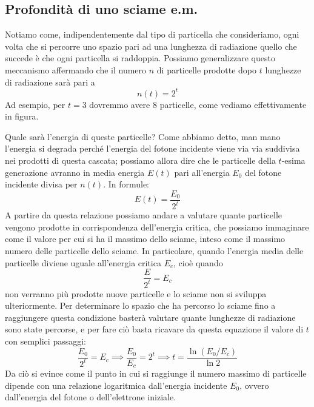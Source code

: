 \subsection{Profondità di uno sciame e.m.}

Notiamo come, indipendentemente dal tipo di particella che consideriamo, ogni volta che si percorre uno spazio pari ad una lunghezza di radiazione quello che succede è che ogni particella si raddoppia. Possiamo generalizzare questo meccanismo affermando che il numero $n$ di particelle prodotte dopo $t$ lunghezze di radiazione sarà pari a
\begin{equation*}
    n(t)=2^t
\end{equation*}
Ad esempio, per $t=3$ dovremmo avere 8 particelle, come vediamo effettivamente in figura.

Quale sarà l'energia di queste particelle? Come abbiamo detto, man mano l'energia si degrada perché l'energia del fotone incidente viene via via suddivisa nei prodotti di questa cascata; possiamo allora dire che le particelle della $t$-esima generazione avranno in media energia $E(t)$ pari all'energia $E_0$ del fotone incidente divisa per $n(t)$. In formule:
\begin{equation*}
    E(t)=\frac{E_0}{2^t}
\end{equation*}
A partire da questa relazione possiamo andare a valutare quante particelle vengono prodotte in corrispondenza dell'energia critica, che possiamo immaginare come il valore per cui si ha il massimo dello sciame, inteso come il massimo numero delle particelle dello sciame. In particolare, quando l'energia media delle particelle diviene uguale all'energia critica $E_c$, cioè quando
\begin{equation*}
    \frac{E}{2^t}=E_c
\end{equation*}
non verranno più prodotte nuove particelle e lo sciame non si sviluppa ulteriormente. Per determinare lo spazio che ha percorso lo sciame fino a raggiungere questa condizione basterà valutare quante lunghezze di radiazione sono state percorse, e per fare ciò basta ricavare da questa equazione il valore di $t$ con semplici passaggi:
\begin{equation*}
    \frac{E_0}{2^t}=E_c
    \implies
    \frac{E_0}{E_c}=2^t
    \implies
    t=\frac{\ln{(E_0/E_c)}}{\ln{2}}
\end{equation*}
Da ciò si evince come il punto in cui si raggiunge il numero massimo di particelle dipende con una relazione logaritmica dall'energia incidente $E_0$, ovvero dall'energia del fotone o dell'elettrone iniziale.

